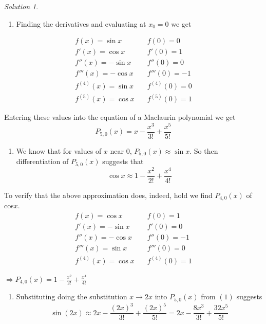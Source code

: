 \documentclass[
]{book}
\providecommand{\tightlist}{%
  \setlength{\itemsep}{0pt}\setlength{\parskip}{0pt}}
\theoremstyle{definition}
\theoremstyle{definition}
\theoremstyle{definition}
\theoremstyle{definition}
\theoremstyle{remark}
\newtheorem*{solution}{Solution}
\begin{document}
\begin{solution}

\begin{enumerate}
\def\labelenumi{\arabic{enumi}.}
\tightlist
\item
  Finding the derivatives and evaluating at \(x_0=0\) we get
\end{enumerate}

\begin{align*} 
f(x)=\sin x & \quad f(0)=0\\
f'(x)=\cos x & \quad f'(0)= 1\\
 f''(x)=-\sin x & \quad f''(0)=0\\
 f'''(x)=-\cos x & \quad f'''(0)=-1\\
 f^{(4)}(x)=\sin x & \quad f^{(4)}(0)=0\\
 f^{(5)}(x)=\cos x & \quad f^{(5)}(0)=1
\end{align*}

Entering these values into the equation of a Maclaurin polynomial we get
\[P_{5,0}(x)=x-\frac{x^3}{3!}+\frac{x^5}{5!}\]

\begin{enumerate}
\def\labelenumi{\arabic{enumi}.}
\setcounter{enumi}{1}
\tightlist
\item
  We know that for values of \(x\) near \(0\), \(P_{5,0}(x)\approx \sin x\). So then differentiation of \(P_{5,0}(x)\) suggests that
  \[\cos x\approx1-\frac{x^2}{2!}+\frac{x^4}{4!}\]
\end{enumerate}

To verify that the above approximation does, indeed, hold we find \(P_{4,0}(x)\) of cos\(x\).
\begin{align*} 
f(x)=\cos x & \quad f(0)=1\\
f'(x)=-\sin x & \quad f'(0)= 0\\
 f''(x)=-\cos x & \quad f''(0)=-1\\
 f'''(x)=\sin x & \quad f'''(0)=0\\
 f^{(4)}(x)=\cos x & \quad f^{(4)}(0)=1
\end{align*}

\(\displaystyle \Rightarrow P_{4,0}(x)=1-\frac{x^2}{2!}+\frac{x^4}{4!}\)

\begin{enumerate}
\def\labelenumi{\arabic{enumi}.}
\setcounter{enumi}{2}
\tightlist
\item
  Substituting doing the substitution \(x\rightarrow 2x\) into \(P_{5,0}(x)\) from \((1)\) suggests
  \[\sin(2x)\approx 2x-\frac{(2x)^3}{3!}+\frac{(2x)^5}{5!}=2x-\frac{8x^3}{3!}+\frac{32x^5}{5!}\]
\end{enumerate}


\end{solution}
\end{document}

